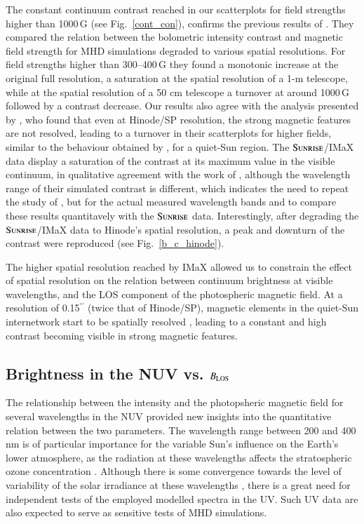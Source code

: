 \documentclass[goettingen, gauss, print]{thesis}
\begin{document}
The constant continuum contrast reached in our scatterplots for field strengths  higher than 1000\,G (see Fig.~\ref{cont_con}), confirms the previous results of \cite{rohrbein_is_2011}. They compared the relation between the bolometric intensity contrast and magnetic field strength for MHD simulations degraded to various spatial resolutions. For field strengths higher than 300--400\,G they found a monotonic increase at the original full resolution, a saturation at the spatial resolution of a 1-m telescope, while at the spatial resolution of a 50 cm telescope a turnover at around 1000\,G followed by a contrast decrease. Our results also agree with the analysis presented by \cite{kobel_continuum_2011}, who found that even at Hinode/SP resolution, the strong magnetic features are not resolved, leading to a turnover in their scatterplots for higher fields, similar to the behaviour obtained by \cite{lawrence_contrast_1993}, for a quiet-Sun region. The $\textsc{Sunrise}$/IMaX data display a saturation of the contrast at its maximum value in the visible continuum, in qualitative agreement with the work of \cite{rohrbein_is_2011}, although the wavelength range of their simulated contrast is different, which indicates the need to repeat the study of \cite{rohrbein_is_2011}, but for the actual measured wavelength bands and to compare these results quantitavely with the $\textsc{Sunrise}$ data. Interestingly, after degrading the $\textsc{Sunrise}$/IMaX data to Hinode's spatial resolution, a peak and downturn of the contrast were reproduced (see Fig.~\ref{b_c_hinode}).

The higher spatial resolution reached by IMaX allowed us to constrain the effect of spatial resolution on the relation between continuum brightness at visible wavelengths, and the LOS component of the photospheric magnetic field. At a resolution of 0.15$^{\prime\prime}$ (twice that of Hinode/SP), magnetic elements in the quiet-Sun internetwork start to be spatially resolved \citep[see][]{lagg_fully_2010}, leading to a constant and high contrast becoming visible in strong magnetic features.

\subsection{Brightness in the NUV vs. $B_{\rm LOS}$ }
The relationship between the intensity and the photopsheric magnetic field for several wavelengths in the NUV provided new insights into the quantitative relation between the two parameters. The wavelength range between 200 and 400 nm is of particular importance for the variable Sun's influence on the Earth's lower atmosphere, as the radiation at these wavelengths affects the stratospheric ozone concentration \citep[e.g.,][]{gray_solar_2010,ermolli_recent_2013,solanki_solar_2013}. Although there is some convergence towards the level of variability of the solar irradiance at these wavelengths \citep{yeo_uv_2015}, there is a great need for independent tests of the employed modelled spectra in the UV. Such UV data are also expected to serve as sensitive tests of MHD simulations.
\end{document}

